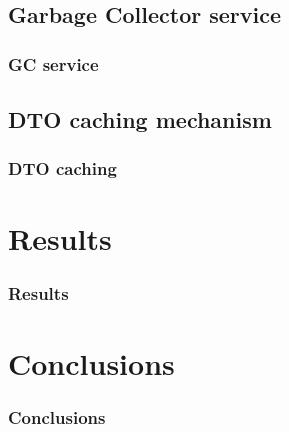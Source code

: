 \documentclass{beamer}
\begin{document}
\subsection{Garbage Collector service}
\begin{frame}
\frametitle{GC service}
\end{frame}

\subsection{DTO caching mechanism}
\begin{frame}
\frametitle{DTO caching}
\end{frame}

\section{Results}
\begin{frame}
\frametitle{Results}
\end{frame}

\section{Conclusions}
\begin{frame}
\frametitle{Conclusions}
\end{frame}
\end{document}
